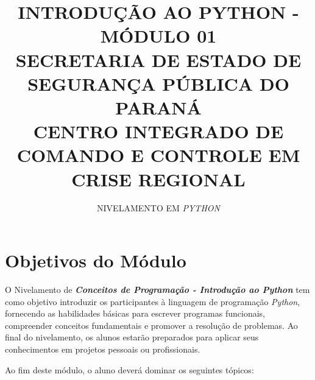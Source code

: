 \documentclass[a4paper, 12pt, onecolumn,singlespacing]{article}
\title{INTRODUÇÃO AO PYTHON - MÓDULO 01\\SECRETARIA DE ESTADO DE SEGURANÇA PÚBLICA DO PARANÁ\\CENTRO INTEGRADO DE COMANDO E CONTROLE EM CRISE REGIONAL}
\author[1]{NIVELAMENTO EM \textit{PYTHON}}
\affil[1]{EQUIPE TÉCNICA CICCR}
\begin{document}
	
	\maketitle
	
	\section{Objetivos do Módulo}
	
	O Nivelamento de \textbf{\textit{Conceitos de Programação - Introdução ao Python }}tem como objetivo introduzir os participantes à linguagem de programação \textit{Python}, fornecendo as habilidades básicas para escrever programas funcionais, compreender conceitos fundamentais e promover a resolução de problemas. Ao final do nivelamento, os alunos estarão preparados para aplicar seus conhecimentos em projetos pessoais ou profissionais.
	
	Ao fim deste módulo, o aluno deverá dominar os seguintes tópicos:
	
\end{document}

